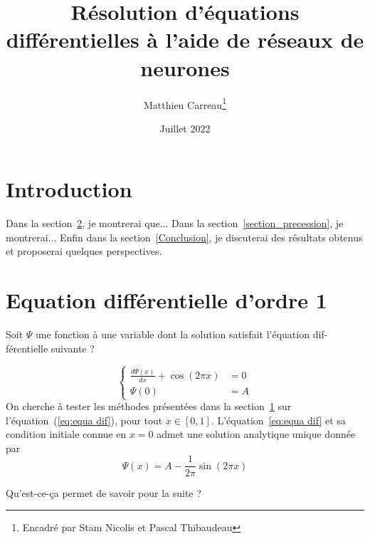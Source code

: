 \documentclass[]{article}
\title{Résolution d'équations différentielles à l'aide de réseaux de neurones}
\author{Matthieu Carreau\thanks{Encadré par Stam Nicolis et Pascal Thibaudeau}}
\date{Juillet 2022}
\begin{document}
\maketitle

\section{Introduction}
\label{Introduction}

{
    Dans la section~\ref{section_ode_1}, je montrerai que...
    Dans la section~\ref{section_precession}, je montrerai...
    Enfin dans la section~\ref{Conclusion}, je discuterai des résultats obtenus et proposerai quelques perspectives.
}

\section{Equation différentielle d'ordre 1}
\label{section_ode_1}

Soit $\Psi$ une fonction à une variable dont la solution satisfait l'équation dif-férentielle suivante {\color{red}{où $A$ désigne}?}

\begin{equation}
\left\{
    \begin{aligned}
        \frac{d\Psi(x)}{dx} + \cos(2\pi x) &= 0 \\
        \Psi(0) &= A
    \end{aligned}
\right.
\label{eq:equa dif}
\end{equation}
On cherche à tester les méthodes présentées dans la section~\ref{Introduction} sur l'équation~(\ref{eq:equa dif}), pour tout $x\in [0,1]$.
L'équation~\ref{eq:equa dif} et sa condition initiale connue en $x=0$ admet une solution analytique unique donnée par
\begin{equation}
    {\Psi}(x) = A - \frac{1}{2\pi}\sin(2\pi x)
    \label{eq:solution analytique}
\end{equation}

{\color{red}Qu'est-ce-ça permet de savoir pour la suite ?}

\end{document}
